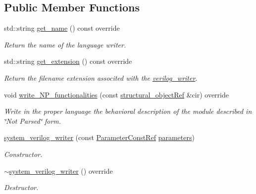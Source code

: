 \subsection*{Public Member Functions}
\begin{DoxyCompactItemize}
\item 
std\+::string \hyperlink{classsystem__verilog__writer_a176f5235f5fd8ec5a0c84f85382475e3}{get\+\_\+name} () const override
\begin{DoxyCompactList}\small\item\em Return the name of the language writer. \end{DoxyCompactList}\item 
std\+::string \hyperlink{classsystem__verilog__writer_a7730b4c523fbdf8e41c4416775194b2f}{get\+\_\+extension} () const override
\begin{DoxyCompactList}\small\item\em Return the filename extension associted with the \hyperlink{classverilog__writer}{verilog\+\_\+writer}. \end{DoxyCompactList}\item 
void \hyperlink{classsystem__verilog__writer_ad9f3428bb7369c26e54a1b7ff7119d9c}{write\+\_\+\+N\+P\+\_\+functionalities} (const \hyperlink{structural__objects_8hpp_a8ea5f8cc50ab8f4c31e2751074ff60b2}{structural\+\_\+object\+Ref} \&cir) override
\begin{DoxyCompactList}\small\item\em Write in the proper language the behavioral description of the module described in \char`\"{}\+Not Parsed\char`\"{} form. \end{DoxyCompactList}\item 
\hyperlink{classsystem__verilog__writer_ad58c38bd3ac975232c9e99460873fd38}{system\+\_\+verilog\+\_\+writer} (const \hyperlink{Parameter_8hpp_a37841774a6fcb479b597fdf8955eb4ea}{Parameter\+Const\+Ref} \hyperlink{classlanguage__writer_aeb717c1d12571e3808759009be752d59}{parameters})
\begin{DoxyCompactList}\small\item\em Constructor. \end{DoxyCompactList}\item 
\hyperlink{classsystem__verilog__writer_a622ed9f43f9cebfa936127d8a333fb53}{$\sim$system\+\_\+verilog\+\_\+writer} () override
\begin{DoxyCompactList}\small\item\em Destructor. \end{DoxyCompactList}\end{DoxyCompactItemize}
